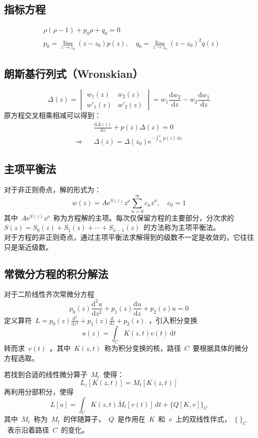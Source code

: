 \documentclass[12pt,a4paper]{article}
\newcommand\dif{\mathrm{d}}
\newcommand\diff{\,\mathrm{d}}
\renewcommand{\[}{\ $\displaystyle}
\renewcommand{\]}{$\ }%
\newcommand{\fdif}[2]{\ensuremath{\frac{\dif #1}{\dif #2}}}
\newcommand{\fdifsq}[2]{\ensuremath{\frac{\dif^2 #1}{\dif #2^2}}}
\newcommand\e{\mathrm{e}}
\newcommand{\summ}[2][n]{\sum_{#1=#2}^\infty}
\begin{document}
  \subsection{指标方程}
	 	\begin{eqnarray*}
	 		&\rho(\rho -1) + p_0\rho + q_0 = 0 \\
	 		&p_0 = \lim\limits_{z\to z_0}(z-z_0)p(z),\quad q_0 = \lim\limits_{z\to z_0} (z-z_0)^2q(z)
	 	\end{eqnarray*}
  \subsection{朗斯基行列式（Wronskian）}
	 	$$
	 	  \Delta(z) = \begin{vmatrix}w_1(z) & w_2(z) \\ w'_1(z) & w'_2(z)\end{vmatrix} = w_1\fdif{w_2}{z} - w_2\fdif{w_1}{z}
	 	$$
	 	原方程交叉相乘相减可以得到：
	 	\begin{eqnarray*}
	 	  &&\fdif{\Delta(z)}{z} + p(z)\Delta(z) = 0 \\
	 	  \Rightarrow &&\Delta(z) = \Delta(z_0)\e^{-\int_{z_0}^{z} p(z)\diff z}
	 	\end{eqnarray*}
  \subsection{主项平衡法}
    对于非正则奇点，解的形式为：
	   $$
	     w(z) = A\e^{S(z)}z^\rho\summ{0}c_nz^n,\quad c_0 = 1
	   $$
	   其中\[A\e^{S(z)}z^\rho\]称为方程解的主项。每次仅保留方程的主要部分，分次求的\[S(z) = S_0(z) + S_1(z)+\cdots +S_{n-1}(z)\]的方法称为主项平衡法。\\
	   对于方程的非正则奇点，通过主项平衡法求解得到的级数不一定是收敛的，它往往只是渐近级数。
  \subsection{常微分方程的积分解法}
    对于二阶线性齐次常微分方程
	 $$
	 	p_0(z)\fdifsq{u}{z} + p_1(z)\fdif{u}{z} + p_2(z)u = 0
	 $$
	 定义算符\[L = p_0(z)\fdifsq{}{z} + p_1(z)\fdif{}{z} + p_2(z)\]，引入积分变换
	 $$
	 	u(z) = \int_C K(z,t)v(t)\diff t
	 $$
	 转而求\[v(t)\]。其中\[K(z,t)\]称为积分变换的核，路径\[C\]要根据具体的微分方程选取。
	 
	 若找到合适的线性微分算子\[M_t\]使得：
	 $$
	 	L_z[K(z,t)] = M_t[K(z,t)]
	 $$
	 再利用分部积分，使得
	 $$
	   L[u] = \int_C K(z,t)\overline M_t[v(t)]\diff t + \{Q[K,v]\}_C
	 $$
	 其中\[\overline M_t\]称为\[M_t\]的伴随算子，\[Q\]是作用在\[K\]和\[v\]上的双线性伴式，\[\{~\}_C\]表示沿着路径\[C\]的变化。
	 
\end{document}
